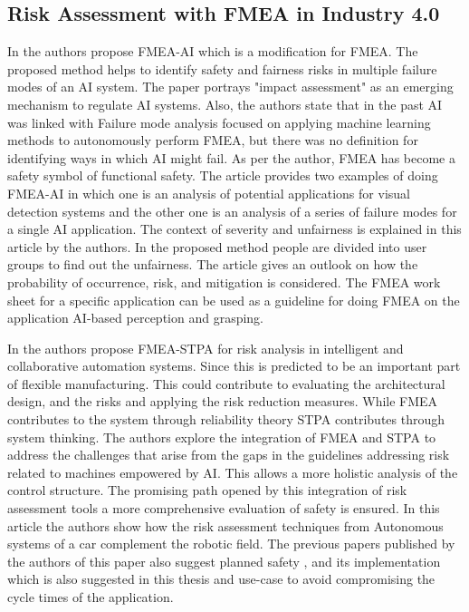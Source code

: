 {\subsection{\RaggedRight Risk Assessment with FMEA in Industry 4.0}{\normalfont\fontsize{14}{16}\bfseries} %
In \cite{author14} the authors propose FMEA-AI which is a modification for FMEA. The proposed method helps to identify safety and fairness risks in multiple failure modes of an AI system. The paper portrays "impact assessment" as an emerging mechanism to regulate AI systems. Also, the authors state that in the past AI was linked with Failure mode analysis focused on applying machine learning methods to autonomously perform FMEA, but there was no definition for identifying ways in which AI might fail. As per the author, FMEA has become a safety symbol of functional safety. The article provides two examples of doing FMEA-AI in which one is an analysis of potential applications for visual detection systems and the other one is an analysis of a series of failure modes for a single AI application. The context of severity and unfairness is explained in this article by the authors. In the proposed method people are divided into user groups to find out the unfairness. The article gives an outlook on how the probability of occurrence, risk, and mitigation is considered. The FMEA work sheet for a specific application can be used as a guideline for doing FMEA on the application AI-based perception and grasping.

In\cite{author30} the authors propose FMEA-STPA for risk analysis in intelligent and collaborative automation systems. Since this is predicted to be an important part of flexible manufacturing. This could contribute to evaluating the architectural design, and the risks and applying the risk reduction measures. While FMEA contributes to the system through reliability theory STPA contributes through system thinking. The authors explore the integration of FMEA and STPA to address the challenges that arise from the gaps in the guidelines addressing risk related to machines empowered by AI. This allows a more holistic analysis of the control structure. The promising path opened by this integration of risk assessment tools a more comprehensive evaluation of safety is ensured. In this article the authors show how the risk assessment techniques from Autonomous systems of a car complement the robotic field. The previous papers published by the authors of this paper also suggest planned safety , and its implementation \cite{author35} which is also suggested in this thesis and use-case to avoid compromising the cycle times of the application.

}
